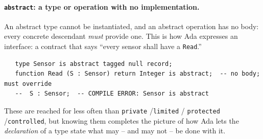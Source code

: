 \paragraph{\texttt{abstract}: a type or operation with no implementation.} An
abstract type cannot be instantiated, and an abstract operation has no body:
every concrete descendant \emph{must} provide one. This is how Ada expresses an
interface: a contract that says ``every sensor shall have a \texttt{Read}.''

\begin{lstlisting}
   type Sensor is abstract tagged null record;
   function Read (S : Sensor) return Integer is abstract;  -- no body; must override
   --  S : Sensor;  -- COMPILE ERROR: Sensor is abstract
\end{lstlisting}

These are reached for less often than \texttt{private} /\texttt{limited} /
\texttt{protected} /\texttt{controlled}, but knowing them completes the picture of
how Ada lets the \emph{declaration} of a type state what may -- and may not -- be
done with it.

